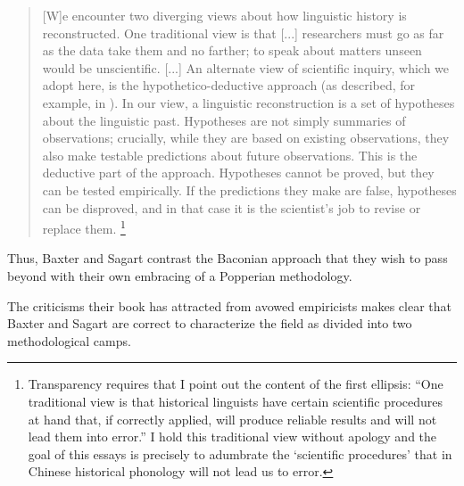 \begin{quote}
[W]e encounter two diverging views about how linguistic history
is reconstructed. One traditional view is that [...] %
researchers must go as far as the data take them and no
farther; to speak about matters unseen would be unscientific.
[...]
An alternate view of scientific inquiry, which we
adopt here, is the hypothetico-deductive approach (as described, for example, in 
\cite[28-29]{Mayr1982}).
In our view, a linguistic reconstruction is a set of hypotheses about
the linguistic past. Hypotheses are not simply summaries of observations; crucially,
while they are based on existing observations, they also make testable predictions
about future observations. This is the deductive part of the approach. Hypotheses
cannot be proved, but they can be tested empirically. If the predictions they make are
false, hypotheses can be disproved, and in that case it is the scientist's job to revise
or replace them. \citep[5]{Baxter2014OldChinese}\footnote{Transparency requires that I point out the content of the first ellipsis: ``One traditional view is that historical linguists have certain scientific procedures at hand that, if correctly applied, will produce reliable results and will not lead them into error.'' I hold this traditional view without apology and the goal of this essays is precisely to adumbrate the `scientific procedures’ that in Chinese historical phonology will not lead us to error.}
\end{quote}
Thus, Baxter and Sagart contrast the Baconian approach that they wish to pass beyond with their own embracing of a Popperian methodology. 

The criticisms their book has attracted from avowed empiricists makes clear that Baxter and Sagart are correct to characterize the field as divided into two methodological camps.  





